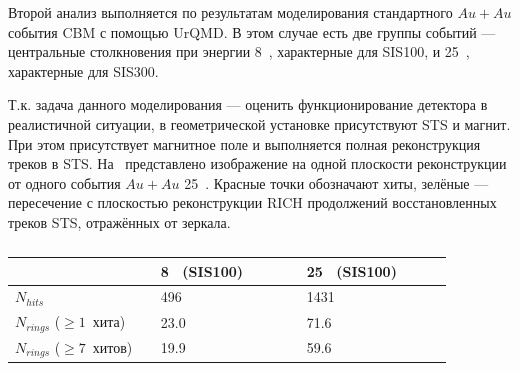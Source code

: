 \begin{figure}[H]
\begin{minipage}[t]{0.495\textwidth}
\end{minipage}
\caption{}
\label{fig:RICHchar3}
\end{figure}



Второй анализ выполняется по результатам моделирования стандартного $Au+Au$ события CBM с помощью UrQMD. В этом случае есть две группы событий --- центральные столкновения при энергии 8~\GeVperNucl{}, характерные для SIS100, и 25~\GeVperNucl{}, характерные для SIS300.

Т.к. задача данного моделирования --- оценить функционирование детектора в реалистичной ситуации, в геометрической установке присутствуют STS и магнит. При этом присутствует магнитное поле и выполняется полная реконструкция треков в STS. На~ представлено изображение на одной плоскости реконструкции от одного события $Au+Au$ 25~\GeVperNucl{}. Красные точки обозначают хиты, зелёные --- пересечение с плоскостью реконструкции RICH продолжений восстановленных треков STS, отражённых от зеркала.


\begin{table}[H]
\caption{}
\label{tabl:RICHAuAuChar}
\begin{tabular}{ | p{0.3\linewidth} | p{0.3\linewidth} | p{0.3\linewidth} | }
\hline
& 8~\GeVperNucl{} (SIS100) & 25~\GeVperNucl{} (SIS100) \\
\hline
$N_{hits}$ & 496 & 1431 \\
\hline
$N_{rings}$ ($\geq1$~хита) & 23.0 & 71.6 \\
\hline
$N_{rings}$ ($\geq7$~хитов) & 19.9 & 59.6 \\
\hline
\end{tabular}
\end{table}

